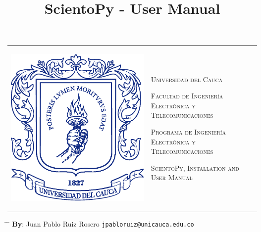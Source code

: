 \documentclass[10pt,letterpaper]{article}
\title{ScientoPy - User Manual}
\begin{document}
\newcommand\upquote[1]{\textquotesingle#1\textquotesingle}



\begin{tabular}{p{1.3in}p{6in}}
\begin{flushleft}
\noindent \includegraphics[bb = 2.5cm 0cm 10.29cm 9.78cm,scale=0.2]{./figures/escudoUnicacuaSolo.eps}
\end{flushleft} &
\normalsize \vspace{0.6cm}
\textsc{Universidad del Cauca}

\textsc{Facultad de Ingeniería Electrónica y Telecomunicaciones}

\textsc{Programa de Ingeniería Electrónica y Telecomunicaciones}


\textsc{ScientoPy, Installation and User Manual}

\end{tabular}
\begin{tabbing}
\hspace{3cm} \= \hspace{5.3cm} \= \hspace{6cm} \kill
\textbf{By}: \> Juan Pablo Ruiz Rosero			\> \texttt{jpabloruiz@unicauca.edu.co} \\
\end{tabbing}
\end{document}
